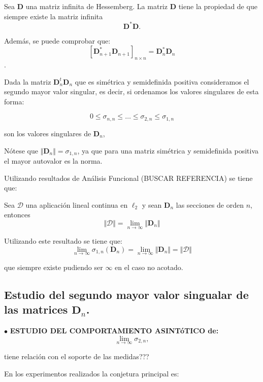 \documentclass[12pt,a4paper]{article}
\begin{document}
\noindent Sea $\mathbf{D}$ una matriz infinita de Hessemberg. La matriz $\mathbf{D}$ tiene la propiedad de que siempre existe la matriz infinita 
$$
\mathbf{D}^{*}\mathbf{D}.
$$

\noindent Adem\'{a}s, se puede comprobar que: 
$$
[\mathbf{D}_{n+1}^{*}\mathbf{D}_{n+1}]_{n\times n}= \mathbf{D}_n^{*}\mathbf{D}_n
$$
.

\noindent Dada la matriz $\mathbf{D}_n^{t}\mathbf{D}_n$ que es sim\'{e}trica y semidefinida positiva consideramos el segundo mayor valor singular, es decir, si ordenamos los valores singulares de esta forma:

$$
0\leq \sigma_{n,n} \leq \dots \leq \sigma_{2,n} \leq \sigma_{1,n} 
$$



\noindent son los valores singulares de $\mathbf{D}_n$, 

\bigskip

\noindent N\'otese que $\Vert \mathbf{D}_n \Vert= \sigma_{1,n}$, ya que para una matriz simétrica y semidefinida positiva el mayor autovalor es la norma.  

\bigskip Utilizando resultados de Análisis Funcional (BUSCAR REFERENCIA) se tiene que:

\begin{prop} Sea $\mathcal{D}$ una aplicaci\'on lineal continua en $\ell_2$ y sean $\mathbf{D}_n$ las secciones de orden $n$, entonces 
$$
\Vert \mathcal{D} \Vert = \lim_{n\to \infty} \Vert \mathbf{D}_n\Vert 
$$

\end{prop} 

\noindent Utilizando este resultado se tiene que: 
$$
\lim_{n\to \infty} \sigma_{1,n}(\mathbf{D}_n)= \lim_{n \to \infty} \Vert \mathbf{D}_n\Vert= \Vert \mathcal{D}\Vert 
$$

\noindent que siempre existe pudiendo ser $\infty$ en el caso no acotado. 

\subsection{Estudio del segundo mayor valor singualar de las matrices $\mathbf{D}_n$.} 

\noindent $\bullet$ {\bf  ESTUDIO DEL COMPORTAMIENTO ASINT\'oTICO de: } 
$$
\lim_{n\to \infty} \sigma_{2,n},
$$

\noindent tiene relaci\'on con el soporte de las medidas???
  
\noindent En los experimentos realizados la conjetura principal es: 
\end{document}
